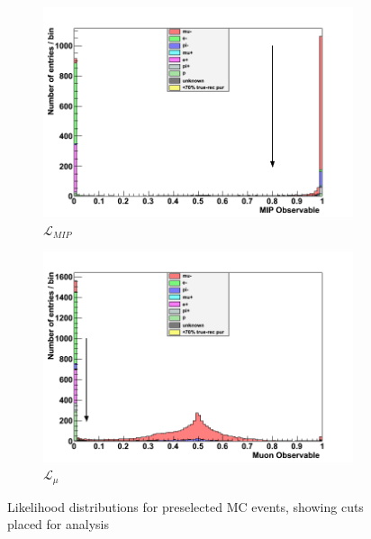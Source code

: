 \begin{figure}[h]
	\begin{subfigure}[t]{0.49\textwidth}	
		\includegraphics[width=\textwidth]{figures/numu/Cuts/numu/Miplik_run12}
		\caption{$\mathcal{L}_{MIP}$}
	\end{subfigure}
	\begin{subfigure}[t]{0.49\textwidth}	
		\includegraphics[width=\textwidth]{figures/numu/Cuts/numu/Mulik_run12}
		\caption{$\mathcal{L}_{\mu}$}
	\end{subfigure}
	\caption{Likelihood distributions for preselected MC events, showing cuts placed for \numu analysis}
	\label{fig:numu_likelihoods}
\end{figure}

